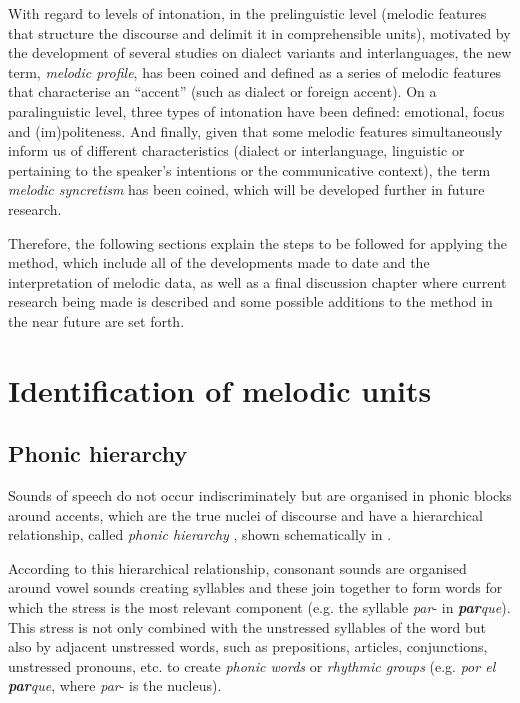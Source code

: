 \documentclass[output=paper]{langscibook}
\begin{document}
With regard to levels of intonation, in the prelinguistic level (melodic features that structure the discourse and delimit it in comprehensible units), motivated by the development of several studies on dialect variants and interlanguages, the new term, \textit{melodic profile}, has been coined and defined as a series of melodic features that characterise an ``accent'' (such as dialect or foreign accent). On a paralinguistic level, three types of intonation have been defined: emotional, focus and (im)politeness. And finally, given that some melodic features simultaneously inform us of different characteristics (dialect or interlanguage, linguistic or pertaining to the speaker's intentions or the communicative context), the term \textit{melodic syncretism} has been coined, which will be developed further in future research.

Therefore, the following sections explain the steps to be followed for applying the method, which include all of the developments made to date and the interpretation of melodic data, as well as a final discussion chapter where current research being made is described and some possible additions to the method in the near future are set forth.

\section{Identification of melodic units}
\label{sec:fon:2}
\subsection{Phonic hierarchy}
Sounds of speech do not occur indiscriminately but are organised in phonic blocks around accents, which are the true nuclei of discourse and have a hierarchical relationship, called \textit{phonic hierarchy} \citep{CanteroSerena.op.2002}, shown schematically in . 

{According to this hierarchical relationship, consonant sounds are organised around vowel sounds creating syllables and these join together to form words for which the stress is the most relevant component (e.g. the syllable \textit{par}- in \textbf{\textit{par}}\textit{que}). This  stress is not only combined with the  unstressed syllables of the word but also by adjacent unstressed words, such as prepositions, articles, conjunctions, unstressed pronouns, etc. to create  \textit{phonic words} or \textit{rhythmic groups} (e.g. \textit{por el} \textbf{\textit{par}}\textit{que}, where \textit{par}- is the nucleus).}
\end{document}
